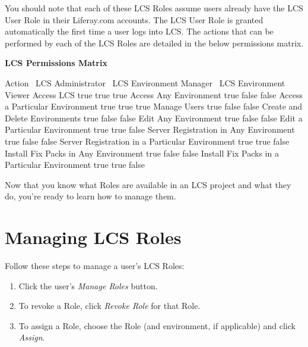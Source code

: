 You should note that each of these LCS Roles assume users already have
the LCS User Role in their Liferay.com accounts. The LCS User Role is
granted automatically the first time a user logs into LCS. The actions
that can be performed by each of the LCS Roles are detailed in the below
permissions matrix.

\textbf{LCS Permissions Matrix}

Action \textbar{} ~LCS Administrator \textbar{} ~LCS Environment Manager
\textbar{} ~LCS Environment Viewer \textbar{} Access LCS \textbar{} true
\textbar{} true \textbar{} true \textbar{} Access Any Environment
\textbar{} true \textbar{} false \textbar{} false \textbar{} Access a
Particular Environment \textbar{} true \textbar{} true \textbar{} true
\textbar{} Manage Users \textbar{} true \textbar{} false \textbar{}
false \textbar{} Create and Delete Environments \textbar{} true
\textbar{} false \textbar{} false \textbar{} Edit Any Environment
\textbar{} true \textbar{} false \textbar{} false \textbar{} Edit a
Particular Environment \textbar{} true \textbar{} true \textbar{} false
\textbar{} Server Registration in Any Environment \textbar{} true
\textbar{} false \textbar{} false \textbar{} Server Registration in a
Particular Environment \textbar{} true \textbar{} true \textbar{} false
\textbar{} Install Fix Packs in Any Environment \textbar{} true
\textbar{} false \textbar{} false \textbar{} Install Fix Packs in a
Particular Environment \textbar{} true \textbar{} true \textbar{} false
\textbar{}

Now that you know what Roles are available in an LCS project and what
they do, you're ready to learn how to manage them.

\section{Managing LCS Roles}\label{managing-lcs-roles}

Follow these steps to manage a user's LCS Roles:

\begin{enumerate}
\def\labelenumi{\arabic{enumi}.}
\item
  Click the user's \emph{Manage Roles} button.
\item
  To revoke a Role, click \emph{Revoke Role} for that Role.
\item
  To assign a Role, choose the Role (and environment, if applicable) and
  click \emph{Assign}.
\end{enumerate}

